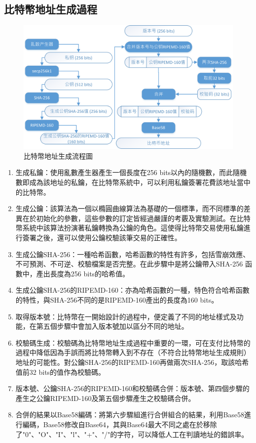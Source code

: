 		\subsection{比特幣地址生成過程}

		\begin{figure}[h]
				\centering
				\includegraphics[width = .9\textwidth]{address.png}
				\caption{比特幣地址生成流程圖}\label{address}
		\end{figure}

		\begin{enumerate}
			\item 生成私鑰：使用亂數產生器產生一個長度在256 bits以內的隨機數，而此隨機數即成為該地址的私鑰，在比特幣系統中，可以利用私鑰簽署花費該地址當中的比特幣。
			\item 生成公鑰：該算法為一個以橢圓曲線算法為基礎的一個標準，而不同標準的差異在於初始化的參數，這些參數的訂定皆經過嚴謹的考覈及實驗測試。在比特幣系統中該算法扮演著私鑰轉換為公鑰的角色。這使得比特幣交易使用私鑰進行簽署之後，還可以使用公鑰校驗該筆交易的正確性。
			\item 生成公鑰SHA-256：一種哈希函數，哈希函數的特性有許多，包括雪崩效應、不可預測、不可逆、校驗檔案是否完整。在此步驟中是將公鑰帶入SHA-256 函數中，產出長度為256 bits的哈希值。
			\item 生成公鑰SHA-256的RIPEMD-160：亦為哈希函數的一種，特色符合哈希函數的特性，與SHA-256不同的是RIPEMD-160產出的長度為160 bits。
			\item 取得版本號：比特幣在一開始設計的過程中，便定義了不同的地址樣式及功能，在第五個步驟中會加入版本號加以區分不同的地址。
			\item 校驗碼生成：校驗碼為比特幣地址生成過程中重要的一環，可在支付比特幣的過程中降低因為手誤而將比特幣轉入到不存在（不符合比特幣地址生成規則）地址的可能性。對公鑰SHA-256的RIPEMD-160再做兩次SHA-256，取該哈希值前32 bits的值作為校驗碼。
			\item 版本號、公鑰SHA-256的RIPEMD-160和校驗碼合併：版本號、第四個步驟的產生之公鑰RIPEMD-160及第五個步驟產生之校驗碼合併。
			\item 合併的結果以Base58編碼：將第六步驟組進行合併組合的結果，利用Base58進行編碼，Base58修改自Base64，其與Base64最大不同之處在於移除了"0"、"O"、"I"、"l"、"+"、"/"的字符，可以降低人工在判讀地址的錯誤率。
		\end{enumerate}

